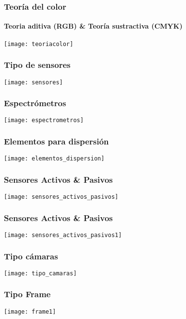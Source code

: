 \documentclass[]{beamer}
\begin{document}
\begin{frame}
\frametitle{Teoría del color}
\framesubtitle{Teoria aditiva (RGB) \& Teoría sustractiva (CMYK)}
\begin{center}
\texttt{[image: teoriacolor]}
\end{center}
\end{frame}
\begin{frame}
\frametitle{Tipo de sensores}
\begin{center}
\texttt{[image: sensores]}
\end{center}
\end{frame}
\begin{frame}
\frametitle{Espectrómetros}
\begin{center}
\texttt{[image: espectrometros]}
\end{center}
\end{frame}
\begin{frame}
\frametitle{Elementos para dispersión}
\begin{center}
\texttt{[image: elementos\_dispersion]}
\end{center}
\end{frame}
\begin{frame}
\frametitle{Sensores Activos \& Pasivos}
\begin{center}
\texttt{[image: sensores\_activos\_pasivos]}
\end{center}
\end{frame}
\begin{frame}
\frametitle{Sensores Activos \& Pasivos}
\begin{center}
\texttt{[image: sensores\_activos\_pasivos1]}
\end{center}
\end{frame}
\begin{frame}
\frametitle{Tipo cámaras}
\begin{center}
\texttt{[image: tipo\_camaras]}
\end{center}
\end{frame}
\begin{frame}
\frametitle{Tipo Frame}
\begin{center}
\texttt{[image: frame1]}
\end{center}
\end{frame}
\end{document}
